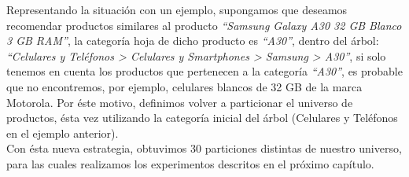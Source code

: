 Representando la situaci\'on con un ejemplo, supongamos que deseamos recomendar productos similares al producto \textit{“Samsung Galaxy A30 32 GB Blanco 3 GB RAM”}, la categor\'ia hoja de dicho producto es \textit{“A30”}, dentro del \'arbol: \textit{“Celulares y Tel\'efonos > Celulares y Smartphones > Samsung > A30”}, si solo tenemos en cuenta los productos que pertenecen a la categor\'ia \textit{“A30”}, es probable que no encontremos, por ejemplo, celulares blancos de 32 GB de la marca Motorola.
Por \'este motivo, definimos volver a particionar el universo de productos, \'esta vez utilizando la categor\'ia inicial del \'arbol (Celulares y Tel\'efonos en el ejemplo anterior).\\

Con \'esta nueva estrategia, obtuvimos 30 particiones distintas de nuestro universo, para las cuales realizamos los experimentos descritos en el pr\'oximo cap\'itulo.
